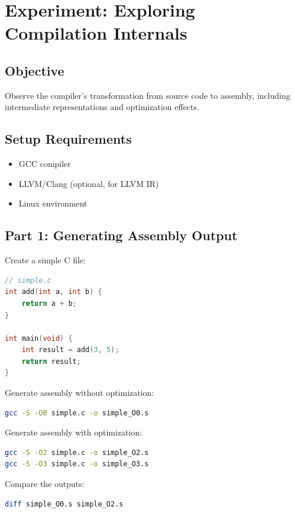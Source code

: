 \section{Experiment: Exploring Compilation Internals}

\subsection{Objective}
Observe the compiler's transformation from source code to assembly, including intermediate representations and optimization effects.

\subsection{Setup Requirements}
\begin{itemize}
\item GCC compiler
\item LLVM/Clang (optional, for LLVM IR)
\item Linux environment
\end{itemize}

\subsection{Part 1: Generating Assembly Output}

Create a simple C file:

\begin{lstlisting}[language=C]
// simple.c
int add(int a, int b) {
    return a + b;
}

int main(void) {
    int result = add(3, 5);
    return result;
}
\end{lstlisting}

Generate assembly without optimization:

\begin{lstlisting}[language=bash]
gcc -S -O0 simple.c -o simple_O0.s
\end{lstlisting}

Generate assembly with optimization:

\begin{lstlisting}[language=bash]
gcc -S -O2 simple.c -o simple_O2.s
gcc -S -O3 simple.c -o simple_O3.s
\end{lstlisting}

Compare the outputs:

\begin{lstlisting}[language=bash]
diff simple_O0.s simple_O2.s
\end{lstlisting}

